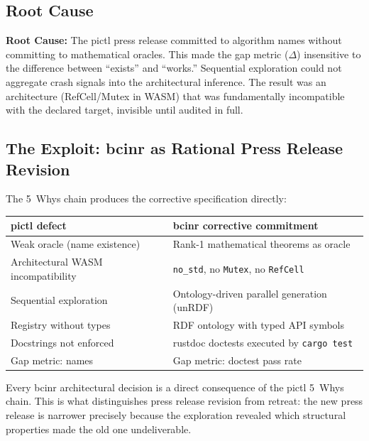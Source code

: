 \documentclass[11pt,a4paper]{article}
\theoremstyle{definition}
\begin{document}
\subsection{Root Cause}

\begin{rulebox}
\textbf{Root Cause:} The pictl press release committed to algorithm names without committing to mathematical oracles. This made the gap metric ($\Delta$) insensitive to the difference between ``exists'' and ``works.'' Sequential exploration could not aggregate crash signals into the architectural inference. The result was an architecture (RefCell/Mutex in WASM) that was fundamentally incompatible with the declared target, invisible until audited in full.
\end{rulebox}

\subsection{The Exploit: bcinr as Rational Press Release Revision}

The 5~Whys chain produces the corrective specification directly:

\begin{center}
\begin{tabular}{@{}l l@{}}
\toprule
\textbf{pictl defect} & \textbf{bcinr corrective commitment} \\
\midrule
Weak oracle (name existence) & Rank-1 mathematical theorems as oracle \\
Architectural WASM incompatibility & \texttt{no\_std}, no \texttt{Mutex}, no \texttt{RefCell} \\
Sequential exploration & Ontology-driven parallel generation (unRDF) \\
Registry without types & RDF ontology with typed API symbols \\
Docstrings not enforced & rustdoc doctests executed by \texttt{cargo test} \\
Gap metric: names & Gap metric: doctest pass rate \\
\bottomrule
\end{tabular}
\end{center}

Every bcinr architectural decision is a direct consequence of the pictl 5~Whys chain. This is what distinguishes press release revision from retreat: the new press release is narrower precisely because the exploration revealed which structural properties made the old one undeliverable.
\end{document}

